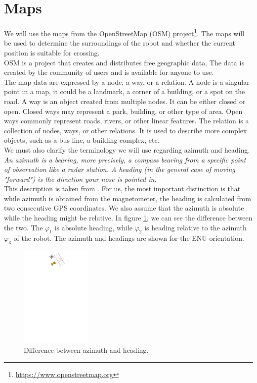 \section{Maps}
    We will use the maps from the OpenStreetMap (OSM) project\footnote{\url{https://www.openstreetmap.org}}. The maps will be used to determine the surroundings of the robot and whether the current position is suitable for crossing.\\
    OSM is a project that creates and distributes free geographic data. The data is created by the community of users and is available for anyone to use. \cite{OSMwiki}\\
    The map data are expressed by a node, a way, or a relation. A node is a singular point in a map, it could be a landmark, a corner of a building, or a spot on the road. A way is an object created from multiple nodes. It can be either closed or open. Closed ways may represent a park, building, or other type of area. Open ways commonly represent roads, rivers, or other linear features. The relation is a collection of nodes, ways, or other relations. It is used to describe more complex objects, such as a bus line, a building complex, etc.\\
    We must also clarify the terminology we will use regarding azimuth and heading.\\
    \emph{An azimuth is a bearing, more precisely, a compass bearing from a specific point of observation like a radar station. A heading (in the general case of moving "forward") is the direction your nose is pointed in.}\\
    This description is taken from \cite{heading}. For us, the most important distinction is that while azimuth is obtained from the magnetometer, the heading is calculated from two consecutive GPS coordinates. We also assume that the azimuth is absolute while the heading might be relative. In figure \ref{fig:azi_head}, we can see the difference between the two. The $\varphi_{1}$ is absolute heading, while $\varphi_{2}$ is heading relative to the azimuth $\varphi_{3}$ of the robot. The azimuth and headings are shown for the ENU orientation.
    \begin{figure}[H]
        \centering
        \includegraphics[trim={0 27 0 0}, clip, height=4.9cm]{images/heading.pdf}
        \caption{Difference between azimuth and heading.}
        \label{fig:azi_head}
    \end{figure}
